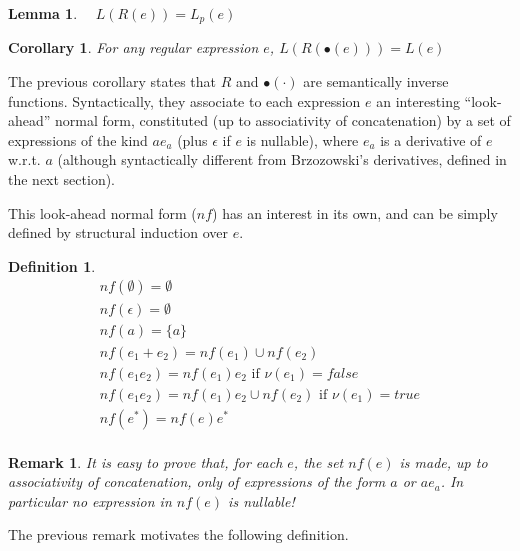 \documentclass[preprint]{sigplanconf}
\newcommand{\true}{\mathit{true}}
\newcommand{\false}{\mathit{false}}
\newcommand{\nul}[1]{\ensuremath{\nu(#1)}}
\newcommand{\dnf}{\mathit{nf}}
\newcounter{item}
\newtheorem{lemma}[item]{Lemma}
\newtheorem{definition}[item]{Definition}
\newtheorem{remark}[item]{Remark}
\newtheorem{corollary}[item]{Corollary}
\begin{document}
\begin{lemma}\label{techx}
$\quad L(R(e)) = L_p(e)$
\end{lemma}

\begin{corollary}
For any regular expression $e$,
$L(R(\bullet (e))) = L(e)$
\end{corollary}

The previous corollary states that $R$ and $\bullet(\cdot)$ are semantically
inverse functions. Syntactically, they associate to each expression $e$
an interesting ``look-ahead'' normal form, constituted (up to associativity
of concatenation) by a set of expressions of the kind $ae_a$ 
(plus $\epsilon$ if $e$ is nullable), where
$e_a$ is a derivative of $e$ w.r.t. $a$ (although syntactically different
from Brzozowski's derivatives, defined in the next section).
 
This look-ahead normal form ($\dnf$) has an interest in its own, and can be 
simply defined by structural induction over $e$.

\begin{definition}
\[
\begin{array}{l}
\dnf(\emptyset)= \emptyset\\
\dnf(\epsilon)= \emptyset\\
\dnf(a) = \{a\}\\
\dnf(e_1+e_2) = \dnf(e_1) \cup \dnf(e_2)\\
\dnf(e_1e_2) = \dnf(e_1)e_2 \mbox{ if } \nul{e_1}=\false\\
\dnf(e_1e_2) = \dnf(e_1)e_2 \cup \dnf(e_2) \mbox{ if } \nul{e_1}=\true\\
\dnf(e^*) = \dnf(e)e^*\\
\end{array}
\]
\end{definition}

\begin{remark}\label{not_nullable}
It is easy to prove that, for each $e$, 
the set $\dnf(e)$ is made, up to associativity of concatenation,
only of expressions of the form $a$ or $a e_a$. In particular
no expression in $\dnf(e)$ is nullable!
\end{remark}

\noindent
The previous remark motivates the following definition.
\end{document}
